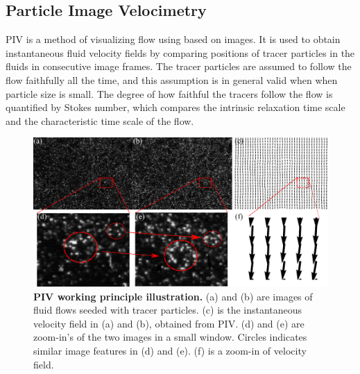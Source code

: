 %
%

\subsection{Particle Image Velocimetry}
PIV is a method of visualizing flow using based on images. It is used to obtain instantaneous fluid velocity fields by comparing positions of tracer particles in the fluids in consecutive image frames. The tracer particles are assumed to follow the flow faithfully all the time, and this assumption is in general valid when when particle size is small. The degree of how faithful the tracers follow the flow is quantified by Stokes number, which compares the intrinsic relaxation time scale and the characteristic time scale of the flow.

\begin{figure}[!ht]
	\begin{center}
	\includegraphics[width=5.5in]{Figs/2-Exp/PIV.pdf}
	\end{center}
	\caption[PIV Working Principle Illustration]
	{
	\textbf{PIV working principle illustration.}
	(a) and (b) are images of fluid flows seeded with tracer particles. (c) is the instantaneous velocity field in (a) and (b), obtained from PIV. (d) and (e) are zoom-in's of the two images in a small window. Circles indicates similar image features in (d) and (e). (f) is a zoom-in of velocity field.
	}
	\label{fig:PIV}
\end{figure}


